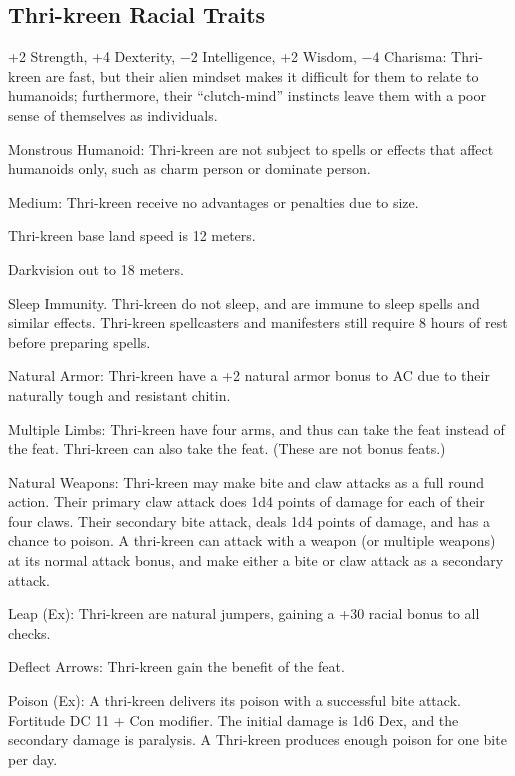\subsection{Thri-kreen Racial Traits}
\begin{itemize*}
    \item +2 Strength, +4 Dexterity, $-2$ Intelligence, +2 Wisdom, $-4$ Charisma: Thri-kreen are fast, but their alien mindset makes it difficult for them to relate to humanoids; furthermore, their ``clutch-mind'' instincts leave them with a poor sense of themselves as individuals.
    \item Monstrous Humanoid: Thri-kreen are not subject to spells or effects that affect humanoids only, such as charm person or dominate person.
    \item Medium: Thri-kreen receive no advantages or penalties due to size.
    \item Thri-kreen base land speed is 12 meters.
    \item Darkvision out to 18 meters.
    \item Sleep Immunity. Thri-kreen do not sleep, and are immune to sleep spells and similar effects. Thri-kreen spellcasters and manifesters still require 8 hours of rest before preparing spells.
    \item Natural Armor: Thri-kreen have a +2 natural armor bonus to AC due to their naturally tough and resistant chitin.
    \item Multiple Limbs: Thri-kreen have four arms, and thus can take the  feat instead of the  feat. Thri-kreen can also take the  feat. (These are not bonus feats.)
    \item Natural Weapons: Thri-kreen may make bite and claw attacks as a full round action. Their primary claw attack does 1d4 points of damage for each of their four claws. Their secondary bite attack, deals 1d4 points of damage, and has a chance to poison. A thri-kreen can attack with a weapon (or multiple weapons) at its normal attack bonus, and make either a bite or claw attack as a secondary attack.
    \item Leap (Ex): Thri-kreen are natural jumpers, gaining a +30 racial bonus to all  checks.
    \item Deflect Arrows: Thri-kreen gain the benefit of the  feat.
    \item Poison (Ex): A thri-kreen delivers its poison with a successful bite attack. Fortitude DC 11 + Con modifier. The initial damage is 1d6 Dex, and the secondary damage is paralysis. A Thri-kreen produces enough poison for one bite per day.

\end{itemize*}
